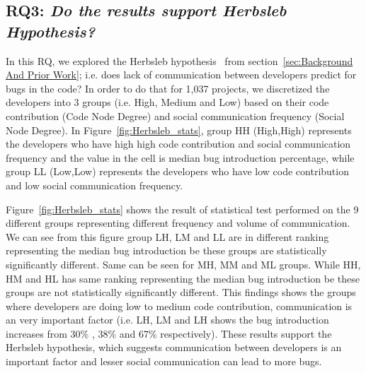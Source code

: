 \documentclass[smallextended]{svjour3}
\begin{document}
\subsection*{\textbf{RQ3: \textit{Do the results support Herbsleb Hypothesis?}}}

In this RQ, we explored the Herbsleb hypothesis~\cite{Herbsleb:2014} from section~\ref{sec:Background And Prior Work}; i.e. does lack of communication between developers predict for bugs in the code? In order to do that for 1,037 projects, we discretized the developers into 3 groups (i.e. High, Medium and Low) based on their code contribution (Code Node Degree) and social communication frequency (Social Node Degree). In Figure~\ref{fig:Herbsleb_stats}, group HH (High,High) represents the developers who have high high code contribution and social communication frequency and the value in the cell is median bug introduction percentage, while group LL (Low,Low) represents the developers who have low code contribution and low social communication frequency. 

Figure~\ref{fig:Herbsleb_stats} shows the result of statistical test performed on the 9 different groups representing different frequency and volume of communication. We can see from this figure group LH, LM and LL are in different ranking representing  the median bug introduction be these groups are statistically significantly different. Same can be seen for MH, MM and ML groups. While HH, HM and HL has same ranking representing the median bug introduction be these groups are not statistically significantly different. This findings shows the groups where developers are doing low to medium code contribution, communication is an very important factor (i.e. LH, LM and LH shows the bug introduction increases from 30\% , 38\% and 67\% respectively). These results support the Herbsleb hypothesis, which suggests communication between developers is an important factor and lesser social communication can lead to more bugs.
\end{document}
